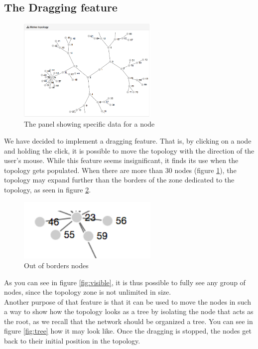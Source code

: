 \subsection{The Dragging feature}

\begin{figure}[!h]
	\centering
	\includegraphics[width=0.6\textwidth]{res/populated.png}
	\caption{The panel showing specific data for a node}
	\label{fig:populated}
\end{figure}


We have decided to implement a dragging feature. That is, by clicking on a node and holding the click, it is possible to move the topology with the direction of the user's mouse. While this feature seems insignificant, it finds its use when the topology gets populated. When there are more than 30 nodes (figure \ref{fig:populated}), the topology may expand further than the borders of the zone dedicated to the topology, as seen in figure \ref{fig:outnode}.


\begin{figure}[!h]
	\centering
	\includegraphics[width=0.6\textwidth]{res/outnode.png}
	\caption{Out of borders nodes}
	\label{fig:outnode}
\end{figure}

As you can see in figure \ref{fig:visible}, it is thus possible to fully see any group of nodes, since the topology zone is not unlimited in size. \\

Another purpose of that feature is that it can be used to move the nodes in such a way to show how the topology looks as a tree by isolating the node that acts as the root, as we recall that the network should be organized a tree. You can see in figure \ref{fig:tree} how it may look like. Once the dragging is stopped, the nodes get back to their initial position in the topology. \\

